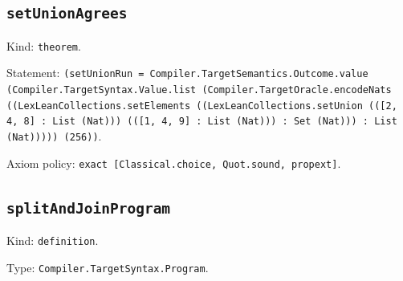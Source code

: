 \documentclass[11pt]{article}
\begin{document}
\subsection*{\texttt{setUnionAgrees}}
\noindent Kind: \texttt{theorem}.\par
\noindent Statement: \texttt{(setUnionRun = Compiler.TargetSemantics.Outcome.value (Compiler.TargetSyntax.Value.list (Compiler.TargetOracle.encodeNats ((LexLeanCollections.setElements ((LexLeanCollections.setUnion (([2, 4, 8] : List (Nat))) (([1, 4, 9] : List (Nat))) : Set (Nat))) : List (Nat))))) (256))}.\par
\noindent Axiom policy: \texttt{exact [Classical.choice, Quot.sound, propext]}.\par
\subsection*{\texttt{splitAndJoinProgram}}
\noindent Kind: \texttt{definition}.\par
\noindent Type: \texttt{Compiler.TargetSyntax.Program}.\par
\end{document}
